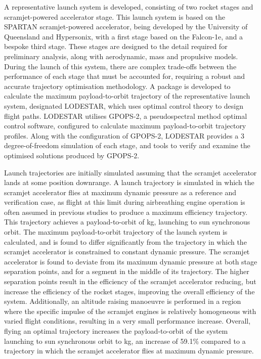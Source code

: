  A representative launch system is developed, consisting of two rocket stages and scramjet-powered accelerator stage.
This launch system is based on the SPARTAN scramjet-powered accelerator, being developed by the University of Queensland and Hypersonix, with a first stage based on the Falcon-1e, and a bespoke third stage. These stages are designed to the detail required for preliminary analysis, along with aerodynamic, mass and propulsive models.
During the launch of this system, there are complex trade-offs between the performance of each stage that must be accounted for, requiring a robust and accurate trajectory optimisation methodology. 
 A package is developed to calculate the maximum payload-to-orbit trajectory of the representative launch system, designated LODESTAR, which uses optimal control theory to design flight paths. LODESTAR utilises GPOPS-2, a pseudospectral method optimal control software, configured to calculate maximum payload-to-orbit trajectory profiles. Along with the configuration of GPOPS-2, LODESTAR provides a 3 degree-of-freedom simulation of each stage, and tools to verify and examine the optimised solutions produced by GPOPS-2.


 
Launch trajectories are initially simulated assuming that the scramjet accelerator lands at some position downrange. A launch trajectory is simulated in which the scramjet accelerator flies at maximum dynamic pressure as a reference and verification case, as flight at this limit during airbreathing engine operation is often assumed in previous studies to produce a maximum efficiency trajectory. This trajectory achieves a payload-to-orbit of \PayloadToOrbitConstqNoReturn kg, launching to sun synchronous orbit.  
The maximum payload-to-orbit trajectory of the launch system is calculated, and is found to differ significantly from the trajectory in which the scramjet accelerator is constrained to constant dynamic pressure. 
 The scramjet accelerator is found to deviate from its maximum dynamic pressure at both stage separation points, and for a segment in the middle of its trajectory.
 The higher separation points result in the efficiency of the scramjet accelerator reducing, but increase the efficiency of the rocket stages, improving the overall efficiency of the system. 
  Additionally, an altitude raising manoeuvre is performed in a region where the specific impulse of the scramjet engines is relatively homogeneous with varied flight conditions, resulting in a very small performance increase. Overall, flying an optimal trajectory increases the payload-to-orbit of the system launching to sun synchronous orbit to \PayloadToOrbitStandardNoReturn kg, an increase of 59.1\% compared to a trajectory in which the scramjet accelerator flies at maximum dynamic pressure.  
 

